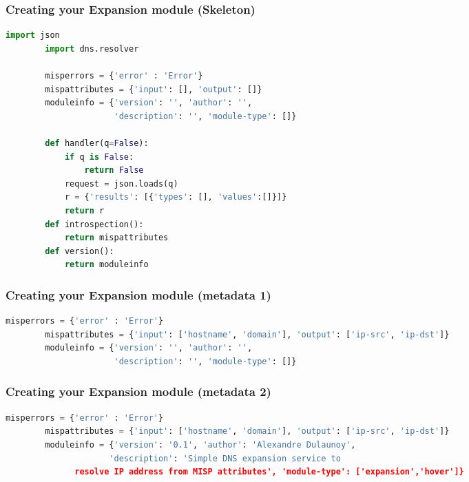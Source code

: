 \begin{frame}[fragile]
      \frametitle{Creating your Expansion module (Skeleton)}
      \begin{adjustbox}{width=\textwidth,height=5cm,keepaspectratio}
      \begin{lstlisting}[language=python]
        import json
        import dns.resolver

        misperrors = {'error' : 'Error'}
        mispattributes = {'input': [], 'output': []}
        moduleinfo = {'version': '', 'author': '',
                      'description': '', 'module-type': []}

        def handler(q=False):
            if q is False:
                return False
            request = json.loads(q)
            r = {'results': [{'types': [], 'values':[]}]}
            return r
        def introspection():
            return mispattributes
        def version():
            return moduleinfo

              \end{lstlisting}
        \end{adjustbox}
\end{frame}

\begin{frame}[fragile]
      \frametitle{Creating your Expansion module (metadata 1)}
      \begin{adjustbox}{width=\textwidth,height=5cm,keepaspectratio}
      \begin{lstlisting}[language=python]
        misperrors = {'error' : 'Error'}
        mispattributes = {'input': ['hostname', 'domain'], 'output': ['ip-src', 'ip-dst']}
        moduleinfo = {'version': '', 'author': '',
                      'description': '', 'module-type': []}
              \end{lstlisting}
        \end{adjustbox}
\end{frame}

\begin{frame}[fragile]
      \frametitle{Creating your Expansion module (metadata 2)}
      \begin{adjustbox}{width=\textwidth,height=10cm,keepaspectratio}
      \begin{lstlisting}[language=python,showstringspaces=false]
        misperrors = {'error' : 'Error'}
        mispattributes = {'input': ['hostname', 'domain'], 'output': ['ip-src', 'ip-dst']}
        moduleinfo = {'version': '0.1', 'author': 'Alexandre Dulaunoy',
                     'description': 'Simple DNS expansion service to
              resolve IP address from MISP attributes', 'module-type': ['expansion','hover']}
        \end{lstlisting}
        \end{adjustbox}
\end{frame}

